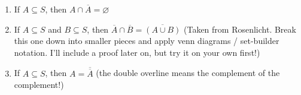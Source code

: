 \documentclass[10pt]{article}
\theoremstyle{definition}
\begin{document}
\begin{enumerate}
    \item If $A\subseteq S$, then $A\cap\overline{A} = \varnothing$
    \item If $A\subseteq S$ and $B\subseteq S$, then
      $\overline{A}\cap\overline{B} = \overline{(A\cup B)}$ (Taken
      from Rosenlicht.  Break this one down into smaller pieces and
      apply venn diagrams / set-builder notation.  I'll include a
      proof later on, but try it on your own first!)
    \item If $A\subseteq S$, then $A = \overline{\overline{A}}$ (the
      double overline means the complement of the complement!)
\end{enumerate}

%
%
%
%
%
%
%
%
%
%
%
%
\end{document}
